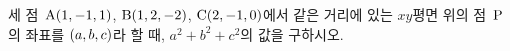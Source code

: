 세 점~$\mathrm{A}(1{,}\mkern3mu\mathopen{}-1{,}\mkern3mu\mathopen{}1)$, $\mathrm{B}(1{,}\mkern3mu\mathopen{}2{,}\mkern3mu\mathopen{}-2)$, $\mathrm{C}(2{,}\mkern3mu\mathopen{}-1{,}\mkern3mu\mathopen{}0)$에서 같은 거리에 있는 $xy$평면 위의 점~$\mathrm{P}$의 좌표를 $(a{,}\mkern3mu\mathopen{}b{,}\mkern3mu\mathopen{}c)$라 할 때, $a^2+b^2+c^2$의 값을 구하시오.
